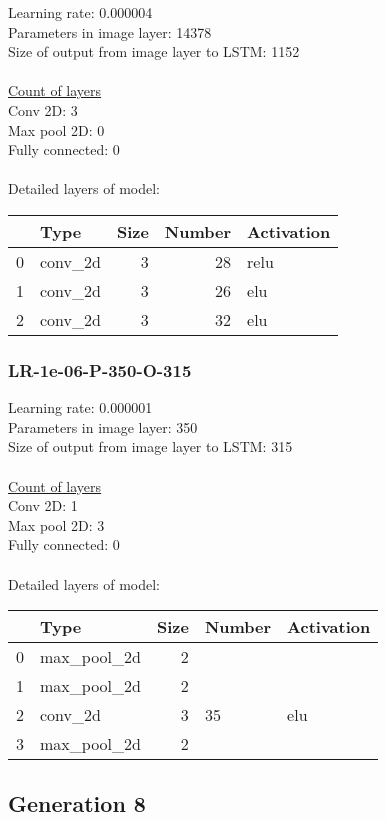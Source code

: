 Learning rate: 0.000004
\\Parameters in image layer: 14378
\\Size of output from image layer to LSTM: 1152
\\\\\underline{Count of layers} 
\\Conv 2D:           3\\Max pool 2D:      0\\Fully connected:  0
\\\\Detailed layers of model: \\\begin{tabular}{rlrrl}
\hline
    & Type    &   Size &   Number & Activation   \\
\hline
  0 & conv\_2d &      3 &       28 & relu         \\
  1 & conv\_2d &      3 &       26 & elu          \\
  2 & conv\_2d &      3 &       32 & elu          \\
\hline
\end{tabular}\subsubsection*{LR-1e-06-P-350-O-315}
Learning rate: 0.000001
\\Parameters in image layer: 350
\\Size of output from image layer to LSTM: 315
\\\\\underline{Count of layers} 
\\Conv 2D:           1\\Max pool 2D:      3\\Fully connected:  0
\\\\Detailed layers of model: \\\begin{tabular}{rlrll}
\hline
    & Type        &   Size & Number   & Activation   \\
\hline
  0 & max\_pool\_2d &      2 &          &              \\
  1 & max\_pool\_2d &      2 &          &              \\
  2 & conv\_2d     &      3 & 35       & elu          \\
  3 & max\_pool\_2d &      2 &          &              \\
\hline
\end{tabular}\subsection{Generation 8}
